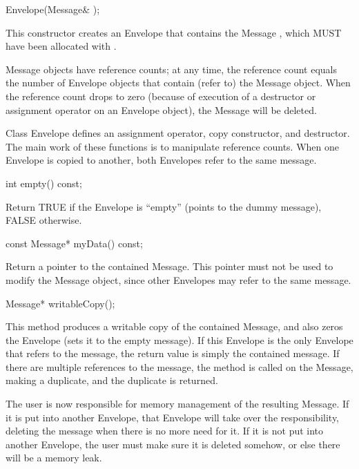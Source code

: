 \begin{example}
Envelope(Message& );
\end{example}

This constructor creates an Envelope that contains the Message
, which MUST have been allocated with .

Message objects have reference counts; at any time, the reference count
equals the number of Envelope objects that contain (refer to) the
Message object.  When the reference count drops to zero (because of
execution of a destructor or assignment operator on an Envelope object),
the Message will be deleted.

Class Envelope defines an assignment operator, copy constructor, and
destructor.  The main work of these functions is to manipulate reference
counts.  When one Envelope is copied to another, both Envelopes refer
to the same message.

\begin{example}
int empty() const;
\end{example}

Return TRUE if the Envelope is ``empty'' (points to the dummy message),
FALSE otherwise.

\begin{example}
const Message* myData() const;
\end{example}

Return a pointer to the contained Message.  This pointer must not be
used to modify the Message object, since other Envelopes may refer to
the same message.

\begin{example}
Message* writableCopy();
\end{example}

This method produces a writable copy of the contained Message, and
also zeros the Envelope (sets it to the empty message).  If this
Envelope is the only Envelope that refers to the message, the
return value is simply the contained message.  If there are multiple
references to the message, the  method is called on the
Message, making a duplicate, and the duplicate is returned.

The user is now responsible for memory management of the resulting
Message.  If it is put into another Envelope, that Envelope will
take over the responsibility, deleting the message when there is
no more need for it.  If it is not put into another Envelope, the
user must make sure it is deleted somehow, or else there will be
a memory leak.

